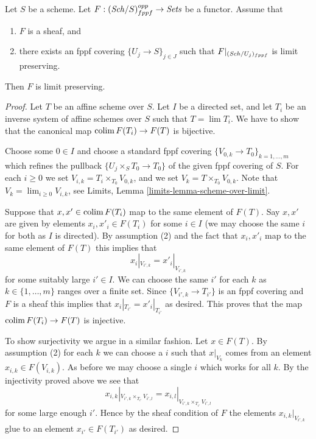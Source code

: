 \begin{lemma}
\label{lemma-sheaf-finite-presentation}
Let $S$ be a scheme.
Let $F : (\mathit{Sch}/S)_{fppf}^{opp} \to \textit{Sets}$ be a functor.
Assume that
\begin{enumerate}
\item $F$ is a sheaf, and
\item there exists an fppf covering $\{U_j \to S\}_{j \in J}$ such that
$F|_{(\mathit{Sch}/U_j)_{fppf}}$ is limit preserving.
\end{enumerate}
Then $F$ is limit preserving.
\end{lemma}

\begin{proof}
Let $T$ be an affine scheme over $S$.
Let $I$ be a directed set, and let
$T_i$ be an inverse system of affine schemes over $S$ such that
$T = \lim T_i$. We have to show that the canonical
map $\mathop{\mathrm{colim}}\nolimits F(T_i) \to F(T)$ is bijective.

\medskip\noindent
Choose some $0 \in I$ and choose a standard fppf covering
$\{V_{0, k} \to T_{0}\}_{k = 1, \ldots, m}$ which refines
the pullback $\{U_j \times_S T_0 \to T_0\}$ of the given fppf covering of $S$.
For each $i \geq 0$ we set $V_{i, k} = T_i \times_{T_0} V_{0, k}$, and
we set $V_k = T \times_{T_0} V_{0, k}$. Note that
$V_k = \lim_{i \geq 0} V_{i, k}$, see
Limits, Lemma \ref{limits-lemma-scheme-over-limit}.

\medskip\noindent
Suppose that $x, x' \in \mathop{\mathrm{colim}}\nolimits F(T_i)$ map to the same
element of $F(T)$. Say $x, x'$ are given by elements $x_i, x'_i \in F(T_i)$
for some $i \in I$ (we may choose the same $i$ for both as $I$ is directed).
By assumption (2) and the fact that $x_i, x'_i$ map to the same element
of $F(T)$ this implies that
$$
x_i|_{V_{i', k}} = x'_i|_{V_{i', k}}
$$
for some suitably large $i' \in I$. We can choose the same $i'$ for each
$k$ as $k \in \{1, \ldots, m\}$ ranges over a finite set.
Since $\{V_{i', k} \to T_{i'}\}$
is an fppf covering and $F$ is a sheaf this implies that
$x_i|_{T_{i'}} = x'_i|_{T_{i'}}$ as desired. This proves that the map
$\mathop{\mathrm{colim}}\nolimits F(T_i) \to F(T)$ is injective.

\medskip\noindent
To show surjectivity we argue in a similar fashion.
Let $x \in F(T)$. By assumption (2) for each $k$ we
can choose a $i$ such that $x|_{V_k}$ comes from an
element $x_{i, k} \in F(V_{i, k})$. As before we may choose a
single $i$ which works for all $k$. By the injectivity
proved above we see that
$$
x_{i, k}|_{V_{i', k} \times_{T_{i'}} V_{i', l}}
=
x_{i, l}|_{V_{i', k} \times_{T_{i'}} V_{i', l}}
$$
for some large enough $i'$. Hence by the sheaf condition of $F$
the elements $x_{i, k}|_{V_{i', k}}$ glue to an element $x_{i'} \in F(T_{i'})$
as desired.
\end{proof}

